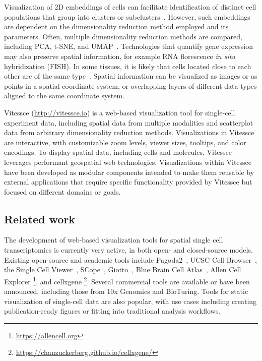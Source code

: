 \documentclass[12pt, letterpaper]{article}
\begin{document}
Visualization of 2D embeddings of cells can facilitate identification of distinct cell populations that group into clusters or subclusters~\cite{wang2017visualization,staahl2016visualization}.
However, such embeddings are dependent on the dimensionality reduction method employed and its parameters.
Often, multiple dimensionality reduction methods are compared, including PCA, t-SNE, and UMAP~\cite{ovchinnikova2019exploring,becht2019dimensionality}.
Technologies that quantify gene expression may also preserve spatial information, for example RNA florescence \textit{in situ} hybridization (FISH).
In some tissues, it is likely that cells located close to each other are of the same type~\cite{stegle2015computational}.
Spatial information can be visualized as images or as points in a spatial coordinate system, or overlapping layers of different data types aligned to the same coordinate system.

Vitessce (\url{http://vitessce.io}) is a web-based visualization tool for single-cell experiment data, including spatial data from multiple modalities and scatterplot data from arbitrary dimensionality reduction methods.
Visualizations in Vitessce are interactive, with customizable zoom levels, viewer sizes, tooltips, and color encodings.
To display spatial data, including cells and molecules, Vitessce leverages performant geospatial web technologies.
Visualizations within Vitessce have been developed as modular components intended to make them reusable by external applications that require specific functionality provided by Vitessce but focused on different domains or goals.

\subsection{Related work}
The development of web-based visualization tools for spatial single cell transcriptomics is currently very active, in both open- and closed-source models.
Existing open-source and academic tools include Pagoda2~\cite{lake2018integrative}, UCSC Cell Browser~\cite{nowakowski2017spatiotemporal}, the Single Cell Viewer~\cite{wang2019single}, SCope~\cite{wouters2019single}, Giotto~\cite{dries2019giotto}, Blue Brain Cell Atlas~\cite{ero2019cell}, Allen Cell Explorer \footnote{\url{https://allencell.org}}, and cellxgene \footnote{\url{https://chanzuckerberg.github.io/cellxgene/}}.
Several commercial tools are available or have been announced, including those from 10x Genomics and BioTuring.
Tools for static visualization of single-cell data are also popular, with use cases including creating publication-ready figures or fitting into traditional analysis workflows.
\end{document}
